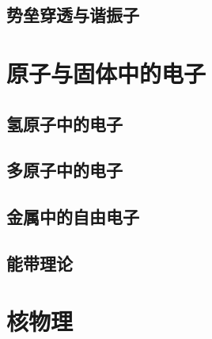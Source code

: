 \subsection{势垒穿透与谐振子}

\section{原子与固体中的电子}

\subsection{氢原子中的电子}

\subsection{多原子中的电子}

\subsection{金属中的自由电子}

\subsection{能带理论}

\section{核物理}